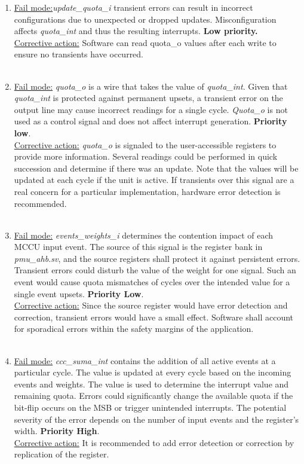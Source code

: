 \begin{enumerate}
\\
\item \underline{Fail mode:}\textit{update\_quota\_i} transient errors can result in incorrect configurations due to unexpected or dropped updates. Misconfiguration affects \textit{quota\_int} and thus the resulting interrupts.\textbf{ Low priority.}\\
\underline{Corrective action:} Software can read quota\_o values after each write to ensure no transients have occurred.\\
\\
\item \underline{Fail mode:} \textit{quota\_o} is a wire that takes the value of \textit{quota\_int}. Given that \textit{quota\_int} is protected against permanent upsets, a transient error on the output line may cause incorrect readings for a single cycle.\textit{ Quota\_o} is not used as a control signal and does not affect interrupt generation. \textbf{Priority low}.\\
\underline{Corrective action:} \textit{quota\_o} is signaled to the user-accessible registers to provide more information. Several readings could be performed in quick succession and determine if there was an update. Note that the values will be updated at each cycle if the unit is active. If transients over this signal are a real concern for a particular implementation, hardware error detection is recommended. \\
\\
\item \underline{Fail mode:} \textit{events\_weights\_i} determines the contention impact of each MCCU input event. The source of this signal is the register bank in \textit{pmu\_ahb.sv}, and the source registers shall protect it against persistent errors. Transient errors could disturb the value of the weight for one signal. Such an event would cause quota mismatches of  cycles over the intended value for a single event upsets.  \textbf{Priority Low}.\\
\underline{Corrective action:} Since the source register would have error detection and correction, transient errors would have a small effect. Software shall account for sporadical errors within the safety margins of the application. \\
\\
\item \underline{Fail mode:} \textit{ccc\_suma\_int} contains the addition of all active events at a particular cycle. The value is updated at every cycle based on the incoming events and weights. The value is used to determine the interrupt value and remaining quota. Errors could significantly change the available quota if the bit-flip occurs on the MSB or trigger unintended interrupts. The potential severity of the error depends on the number of input events and the register's width. \textbf{Priority High}.\\
\underline{Corrective action:} It is recommended to add error detection or correction by replication of the register.\\
\\
\end{enumerate}
